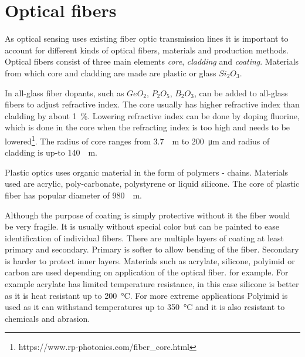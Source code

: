 \section{Optical fibers}\label{txt.optical.fibers}


As optical sensing uses existing fiber optic transmission lines it is important to account for different kinds of optical fibers, materials and production methods. Optical fibers consist of three main elements \textit{core}, \textit{cladding} and \textit{coating}. Materials from which core and cladding are made are plastic or glass $Si_2O_3$. 

In all-glass fiber dopants, such as $GeO_2$, $P_2O_5$, $B_2O_3$, can be added to all-glass fibers to adjust refractive index. The core usually has higher refractive index than cladding by about \qty{1}{\si{\percent}}. Lowering refractive index can be done by doping fluorine, which is done in the core when the refracting index is too high and needs to be lowered\footnote{https://www.rp-photonics.com/fiber\_core.html}. The radius of core ranges from \qty{3.7}{\si{\micro}\meter} to \qty{200}{\micro\meter} and radius of cladding is up-to \qty{140}{\si{\micro}\meter}\cite{cabling}.

Plastic optics uses organic material in the form of polymers - chains. Materials used are acrylic, poly-carbonate, polystyrene or liquid silicone. The core of plastic fiber has popular diameter of \qty{980}{\si{\micro}\meter}.

Although the purpose of coating is simply protective without it the fiber would be very fragile. It is usually without special color but can be painted to ease identification of individual fibers. There are multiple layers of coating at least primary and secondary. Primary is softer to allow bending of the fiber. Secondary is harder to protect inner layers. Materials such as acrylate, silicone, polyimid or carbon are used depending on application of the optical fiber. for example. For example acrylate has limited temperature resistance, in this case silicone is better as it is heat resistant up to \qty{200}{\celsius}\cite{cabling}. For more extreme applications Polyimid is used as it can withstand temperatures up to \qty{350}{\celsius} and it is also resistant to chemicals and abrasion\cite{cabling}.


